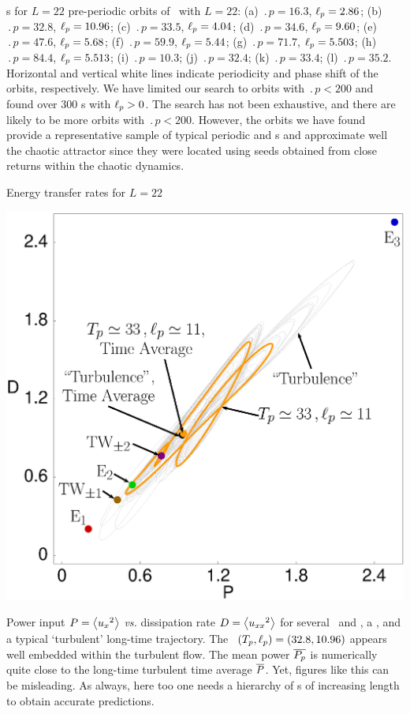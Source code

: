\documentclass{theo1poster}[2003/04/25]
\begin{document}
\begin{poster}{3}
\begin{sheet}{\Rpo s for $L=22$}
pre-periodic
orbits of \KSe\ with $L = 22$:
(a) $\period{p} = 16.3$, $\ell_p = 2.86$;
(b) $\period{p} = 32.8$, $\ell_p = 10.96$;
(c) $\period{p} = 33.5$, $\ell_p = 4.04$;
(d) $\period{p} = 34.6$, $\ell_p = 9.60$;
(e) $\period{p} = 47.6$, $\ell_p = 5.68$;
(f) $\period{p} = 59.9$, $\ell_p = 5.44$;
(g) $\period{p} = 71.7$, $\ell_p = 5.503$;
(h) $\period{p} = 84.4$, $\ell_p = 5.513$;
(i) $\period{p} = 10.3$;
(j) $\period{p} = 32.4$;
(k) $\period{p} = 33.4$;
(l) $\period{p} = 35.2$.
Horizontal and vertical white lines indicate periodicity and phase
shift of the orbits, respectively. We have limited our search to orbits with $\period{p} < 200$ and found
over 300 \rpo s with $\ell_p > 0$.
The search has not been exhaustive, and there are likely to be more
orbits with $\period{p} < 200$. However, the orbits we have found provide a representative sample of
typical periodic and \rpo s and approximate well the chaotic
attractor since they were located using seeds obtained from close
returns within the chaotic dynamics.

\end{sheet}


\begin{sheet}{Energy transfer rates for $L=22$}

\centerline{\includegraphics[width=.4\textwidth]{../../figs/energyBalance_pst.eps}}
Power input $P = \left\langle {u_{x}{}^2} \right\rangle$ {\em vs.}
dissipation rate  $D =  \left\langle {u_{xx}{}^2} \right\rangle$
for several  \eqva\ and \reqva,
a \rpo , and a typical `turbulent' long-time trajectory.
The \rpo\ $({T_{p}},\ell_p) = (32.8,10.96)$ appears well embedded
within the turbulent flow. The mean power $\overline{P_p}$ 
is numerically quite close to the long-time
turbulent time average $\overline{P}$.
Yet, figures like this can be misleading. As always, here too one needs a hierarchy
of \po s of increasing length to obtain accurate
predictions.


\end{sheet}



\end{poster}
\end{document}

